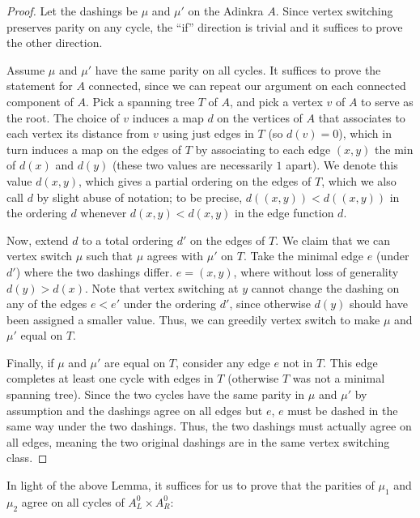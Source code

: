 \documentclass[12pt,twoside,singlespace]{article}
\numberwithin{equation}{section}
\theoremstyle{definition}
\begin{document}
\begin{proof}
Let the dashings be $\mu$ and $\mu'$ on the Adinkra $A$. Since vertex switching preserves parity on any cycle, the ``if'' direction is trivial and it suffices to prove the other direction.

Assume $\mu$ and $\mu'$ have the same parity on all cycles. It suffices to prove the statement for $A$ connected, since we can repeat our argument on each connected component of $A$. Pick a spanning tree $T$ of $A$, and pick a vertex $v$ of $A$ to serve as the root. The choice of $v$ induces a map $d$ on the vertices of $A$ that associates to each vertex its distance from $v$ using just edges in $T$ (so $d(v) = 0$), which in turn induces a map on the edges of $T$ by associating to each edge $(x,y)$ the min of $d(x)$ and $d(y)$ (these two values are necessarily $1$ apart). We denote this value $d(x,y)$, which gives a partial ordering on the edges of $T$, which we also call $d$ by slight abuse of notation; to be precise, $d((x,y)) < d((x,y))$ in the ordering $d$ whenever $d(x,y) < d(x,y)$ in the edge function $d$.

Now, extend $d$ to a total ordering $d'$ on the edges of $T$. We claim that we can vertex switch $\mu$ such that $\mu$ agrees with $\mu'$ on $T$. Take the minimal edge $e$ (under $d'$) where the two dashings differ. $e = (x,y)$, where without loss of generality $d(y) > d(x)$. Note that vertex switching at $y$ cannot change the dashing on any of the edges $e < e'$ under the ordering $d'$, since otherwise $d(y)$ should have been assigned a smaller value. Thus, we can greedily vertex switch to make $\mu$ and $\mu'$ equal on $T$.

Finally, if $\mu$ and $\mu'$ are equal on $T$, consider any edge $e$ not in $T$. This edge completes at least one cycle with edges in $T$ (otherwise $T$ was not a minimal spanning tree). Since the two cycles have the same parity in $\mu$ and $\mu'$ by assumption and the dashings agree on all edges but $e$, $e$ must be dashed in the same way under the two dashings. Thus, the two dashings must actually agree on all edges, meaning the two original dashings are in the same vertex switching class.

\end{proof}

In light of the above Lemma, it suffices for us to prove that the parities of $\mu_1$ and $\mu_2$ agree on all cycles of $A_L^0\times A_R^0$:
\end{document}
